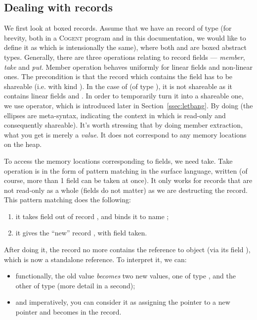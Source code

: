 \documentclass[a4paper]{article}
\newcommand{\cogent}{\textsc{Cogent}\xspace}
\begin{document}
\subsection{Dealing with records} \label{ssec:records}
We first look at boxed records. Assume that we have an record  of type  (for
brevity, both in a \cogent program and in this documentation, we would like to define it as  which is intensionally the same),
where both  and  are boxed abstract types. Generally, there are three operations relating to record fields --- \emph{member}, \emph{take} and \emph{put}.
Member operation behaves uniformly for linear fields and non-linear ones. The precondition is that the record which contains the field
has to be shareable (i.e. with kind ). In the case of  (of type ), it is not shareable as it contains linear fields  and .
In order to temporarily turn it into a shareable one, we use \code{!} operator, which is introduced later in Section~\ref{ssec:letbang}.
By doing  (the ellipses are meta-syntax, indicating the context in which  is read-only and consequently shareable).
It's worth stressing that by doing member extraction, what you get is merely a \emph{value}. It does not correspond to any memory locations on the heap.

To access the memory locations corresponding to fields, we need take. Take operation is in the form of pattern matching in the
surface language, written  (of course, more than 1 field can be taken at once).
It only works for records that are not read-only as a whole (fields do not matter) as we are destructing the
record.
This pattern matching does the following:
\begin{enumerate}
\item it takes field  out of record , and binds it to name ;
\item it gives the ``new'' record , with field  taken.
\end{enumerate}
After doing it, the record  no more contains the reference to object  (via its field
), which is now a standalone reference.
To interpret it, we can:
\begin{itemize}
\item functionally, the old value  \emph{becomes} two new values, one of type , and the other of type
   (more detail in a second);
\item and imperatively, you can consider it as assigning the pointer to  a new pointer  and
 becomes  in the record.
\end{itemize}
\end{document}
